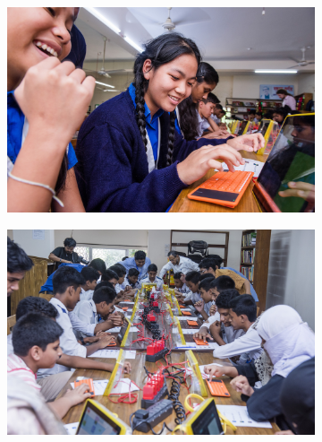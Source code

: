 \documentclass[12pt]{report} %
\begin{document}
\begin{figure}[t!]
    \centering
    \begin{subfigure}[]{0.46\textwidth}
        \centering
        \includegraphics[width=1.0\textwidth]{rang2}
    \end{subfigure}
    \begin{subfigure}[]{0.46\textwidth}
        \centering
        \includegraphics[width=1.0\textwidth]{_TMT7018}
    \end{subfigure}


\end{figure}
\end{document}
